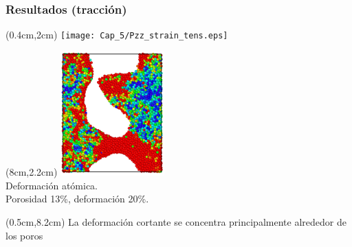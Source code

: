 \begin{frame}
    \frametitle{Resultados (tracci\'on)}
    \begin{textblock*}{7cm}(0.4cm,2cm) %
        \texttt{[image: Cap\_5/Pzz\_strain\_tens.eps]}
    \end{textblock*}
    \begin{textblock*}{4cm}(8cm,2.2cm) %
        \includegraphics[width=4cm]{Presentacion_PANACM_Franco/13_20strain_tens_2.png}\\
        \centering
        \scriptsize{Deformaci\'on at\'omica.\\Porosidad 13\%, deformaci\'on 20\%.}
    \end{textblock*}
    \begin{textblock*}{11.5cm}(0.5cm,8.2cm) %
	\centering
        La deformaci\'on cortante se concentra principalmente alrededor de los poros
    \end{textblock*}
\end{frame}


